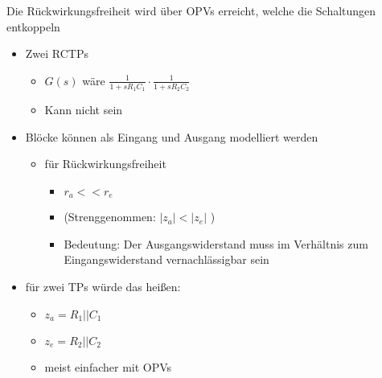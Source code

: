 \documentclass[letterpaper,10pt,english]{jupyterBook}
\begin{document}
\sphinxAtStartPar
Die Rückwirkungsfreiheit wird über OPVs erreicht,
welche die Schaltungen entkoppeln
\begin{itemize}
\item {} 
\sphinxAtStartPar
Zwei RC\sphinxhyphen{}TPs
\begin{itemize}
\item {} 
\sphinxAtStartPar
\(G(s)\) wäre \(\frac{1}{1+sR_1C_1}\cdot\frac{1}{1+sR_2C_2}\)

\item {} 
\sphinxAtStartPar
Kann nicht sein

\end{itemize}

\item {} 
\sphinxAtStartPar
Blöcke können als Eingang und Ausgang modelliert werden
\begin{itemize}
\item {} 
\sphinxAtStartPar
für Rückwirkungsfreiheit
\begin{itemize}
\item {} 
\sphinxAtStartPar
\(r_a << r_e\)

\item {} 
\sphinxAtStartPar
(Strenggenommen: \(|z_a| < |z_e|\) )

\item {} 
\sphinxAtStartPar
Bedeutung: Der Ausgangswiderstand muss im Verhältnis zum Eingangswiderstand vernachlässigbar sein

\end{itemize}

\end{itemize}

\item {} 
\sphinxAtStartPar
für zwei TPs würde das heißen:
\begin{itemize}
\item {} 
\sphinxAtStartPar
\(z_a = R_1 || C_1\)

\item {} 
\sphinxAtStartPar
\(z_e = R_2 || C_2\)

\item {} 
\sphinxAtStartPar
meist einfacher mit OPVs

\end{itemize}

\end{itemize}

\begin{DUlineblock}{0em}
\item[] 
\end{DUlineblock}
\end{document}
